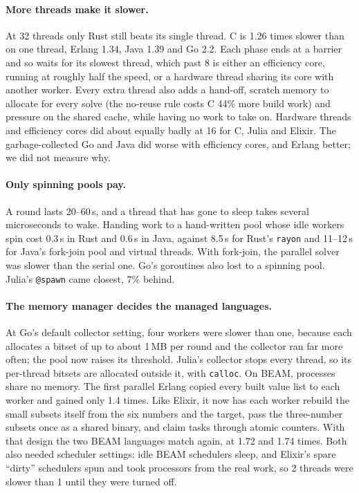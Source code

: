 \documentclass[11pt,a4paper]{article}
\theoremstyle{definition}
\theoremstyle{remark}
\begin{document}
\paragraph{More threads make it slower.}
At 32 threads only Rust still beats its single thread. C is 1.26 times slower than on one thread, Erlang
1.34, Java 1.39 and Go 2.2. Each phase ends at a barrier and so waits for its slowest thread, which past 8 is
either an efficiency core, running at roughly half the speed, or a hardware thread sharing its core with
another worker. Every extra thread also adds a hand-off, scratch memory to allocate for every solve (the no-reuse
rule costs C 44\% more build work) and pressure on the shared cache, while having no work to take on.
Hardware threads and efficiency cores did about equally badly at 16 for C, Julia and Elixir. The
garbage-collected Go and Java did worse with efficiency cores, and Erlang better; we did not measure why.

\paragraph{Only spinning pools pay.}
A round lasts 20--60\,\textmu s, and a thread that has gone to sleep takes several microseconds to wake.
Handing work to a hand-written pool whose idle workers spin cost 0.3\,\textmu s in Rust and 0.6\,\textmu s in
Java, against 8.5\,\textmu s for Rust's \texttt{rayon} and 11--12\,\textmu s for Java's fork-join pool and
virtual threads. With fork-join, the parallel solver was slower than the serial one. Go's goroutines also lost to a
spinning pool. Julia's \texttt{@spawn} came closest, 7\% behind.

\paragraph{The memory manager decides the managed languages.}
At Go's default collector setting, four workers were slower than one, because each allocates a bitset of up
to about 1\,MB per round and the collector ran far more often; the pool now raises its threshold. Julia's
collector stops every thread, so its per-thread bitsets are allocated outside it, with \texttt{calloc}.
On BEAM, processes share no memory. The first parallel Erlang copied every built value list to each worker
and gained only 1.4 times. Like Elixir, it now has each worker rebuild the small subsets itself from the
six numbers and the target, pass the three-number subsets once as a shared binary, and claim tasks through
atomic counters. With that design the two BEAM languages match again, at 1.72 and 1.74 times. Both also
needed scheduler settings: idle BEAM schedulers sleep, and Elixir's spare ``dirty'' schedulers spun and took
processors from the real work, so 2 threads were slower than 1 until they were turned off.
\end{document}
